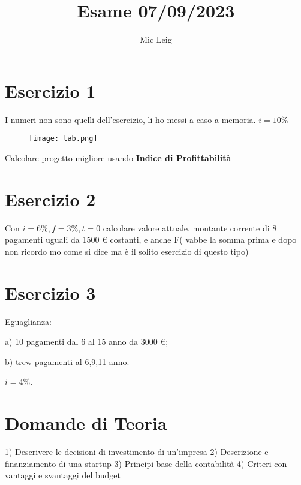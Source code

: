 \documentclass{article}
\title{Esame 07/09/2023}
\author{Mic Leig}
\begin{document}
\maketitle



\section{Esercizio {1}}
I numeri non sono quelli dell'esercizio, li ho messi a caso a memoria.
$i = 10\%$

\begin{figure}[h] %
\texttt{[image: tab.png]} %
\label{fig:esempio} %
\end{figure} %

Calcolare progetto migliore usando \textbf{Indice di Profittabilità}


\section{Esercizio 2}
Con $i = 6\%, f = 3\%, t=0$ calcolare valore attuale, montante corrente di 8 pagamenti uguali da 1500 \euro
costanti, e anche F( vabbe la somma prima e dopo non ricordo mo come si dice ma è il solito esercizio di questo tipo)

\section{Esercizio 3}
Eguaglianza:

a) 10 pagamenti dal 6 al 15 anno da 3000 \euro;

b) trew pagamenti al 6,9,11 anno.

$i = 4\%$.

\section{Domande di Teoria}
1) Descrivere le decisioni di investimento di un'impresa
2) Descrizione e finanziamento di una startup
3) Principi base della contabilità
4) Criteri con vantaggi e svantaggi del budget
\end{document}
